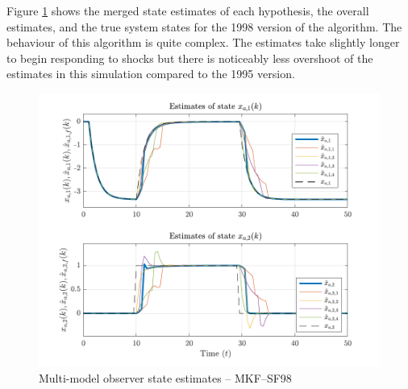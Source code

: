 Figure \ref{fig:rod-obs-sim-test-x_est-SF98} shows the merged state estimates of each hypothesis, the overall estimates, and the true system states for the 1998 version of the algorithm. The behaviour of this algorithm is quite complex. The estimates take slightly longer to begin responding to shocks but there is noticeably less overshoot of the estimates in this simulation compared to the 1995 version.   
\begin{figure}[htp]
	\centering
	\includegraphics[width=13cm]{images/rod_MKF_test_sim_MKF_SF98_x_est.pdf}
	\caption{Multi-model observer state estimates – MKF--SF98}
	\label{fig:rod-obs-sim-test-x_est-SF98}
\end{figure}

